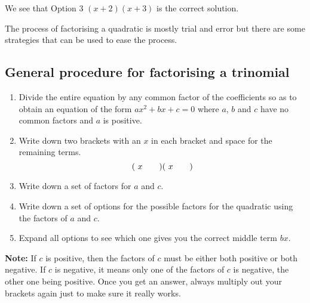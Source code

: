 \par
We see that Option 3 $(x+2)(x+3)$ is the correct solution. 
\par
The process of factorising a quadratic is mostly trial and error but there are some strategies that can be used to ease the process.\par 
\par
{}


\subsection*{General procedure for factorising a trinomial}

\begin{enumerate}[itemsep=5pt, label=\textbf{\arabic*}. ] 
\item Divide the entire equation by any common factor of the coefficients so as to obtain an equation of the form $a{x}^{2}+bx+c=0$ where $a$, $b$ and $c$ have no common factors and $a$ is positive.
\item Write down two brackets with an $x$ in each bracket and space for the remaining terms.
\begin{equation*}
(\ x\phantom{\rule{2.em}{0ex}})(\ x\phantom{\rule{2.em}{0ex}})
\end{equation*}

\item Write down a set of factors for $a$ and $c$.
\item Write down a set of options for the possible factors for the quadratic using the factors of $a$ and $c$.
\item Expand all options to see which one gives you the correct middle term $bx$.
\end{enumerate}

\par
\textbf{Note:} If $c$ is positive, then the factors of $c$ must be either both positive or both negative. If $c$ is negative, it means only one of the factors of $c$ is negative, the other one being positive.
Once you get an answer, always multiply out your brackets again just to make sure it really works.

